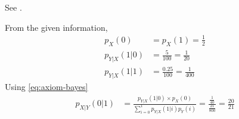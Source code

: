 See . 
\begin{table}[h!]
	
	\caption{}
	\label{tab:ncert/12/13/6/3/table1}
\end{table}
From the given information,
\begin{align}
	\label{eq:ncert/12/13/6/3/eq1}
	p_X(0)&=p_X(1)=\frac{1}{2}\\
	p_{Y|X}(1|0)&=\frac{5}{100}
				=\frac{1}{20}\\
	p_{Y|X}(1|1)&=\frac{0.25}{100}
				=\frac{1}{400}
\end{align}
Using \eqref{eq:axiom-bayes}
\begin{align}
	p_{X|Y}(0|1)&=\frac{p_{Y|X}(1|0) \times p_X(0)}{\sum_{i=0}^{1}p_{Y|X}(1|i)p_Y(i)}
				=\frac{\frac{1}{40}}{\frac{21}{800}}
				=\frac{20}{21}
\end{align}
